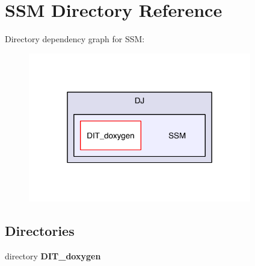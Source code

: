 \section{S\-S\-M Directory Reference}
\label{dir_535975018cac6ecbedf1d757271dec4b}
Directory dependency graph for S\-S\-M\-:
\nopagebreak
\begin{figure}[H]
\begin{center}
\leavevmode
\includegraphics[width=276pt]{dir_535975018cac6ecbedf1d757271dec4b_dep}
\end{center}
\end{figure}
\subsection*{Directories}
\begin{DoxyCompactItemize}
\item 
directory {\bf D\-I\-T\-\_\-doxygen}
\end{DoxyCompactItemize}
